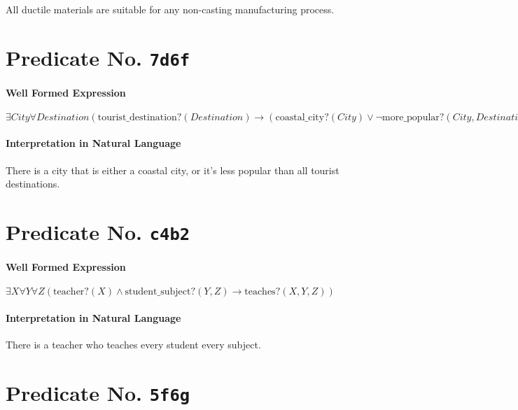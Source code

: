 \documentclass[11pt]{article}
\begin{document}
All ductile materials are suitable for any non-casting manufacturing process.



\section{Predicate No. \texttt{7d6f}}
\label{sec:orgc25b242}

\paragraph*{Well Formed Expression}
\label{sec:orgc843864}

\(\exists \mathit{City} \forall \mathit{Destination} (\mathrm{tourist\_destination?}(\mathit{Destination}) \rightarrow (\mathrm{coastal\_city?}(\mathit{City}) \lor \neg \mathrm{more\_popular?}(\mathit{City}, \mathit{Destination})))\)

\paragraph*{Interpretation in Natural Language}
\label{sec:orgcec3ae4}

There is a city that is either a coastal city, or it's less popular than all tourist destinations.



\section{Predicate No. \texttt{c4b2}}
\label{sec:org8633f21}

\paragraph*{Well Formed Expression}
\label{sec:org8df946d}

\(\exists X \forall Y \forall Z (\text{teacher?}(X) \land \text{student\_subject?}(Y, Z) \rightarrow \text{teaches?}(X, Y, Z))\)

\paragraph*{Interpretation in Natural Language}
\label{sec:org5096ad1}

There is a teacher who teaches every student every subject.



\section{Predicate No. \texttt{5f6g}}
\label{sec:org94c1d87}
\end{document}
